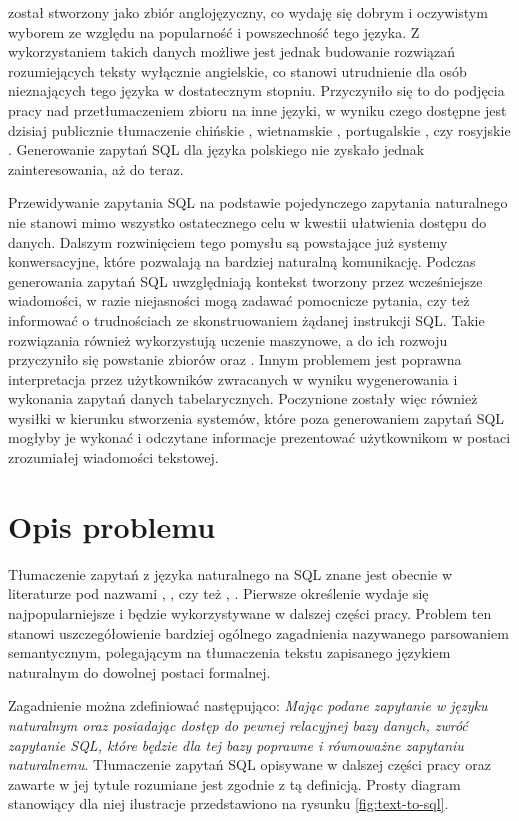  został stworzony jako zbiór anglojęzyczny, co wydaję się dobrym i oczywistym wyborem ze względu na popularność i powszechność tego języka. Z wykorzystaniem takich danych możliwe jest jednak budowanie rozwiązań rozumiejących teksty wyłącznie angielskie, co stanowi utrudnienie dla osób nieznających tego języka w dostatecznym stopniu. Przyczyniło się to do podjęcia pracy nad przetłumaczeniem zbioru  na inne języki, w wyniku czego dostępne jest dzisiaj publicznie tłumaczenie chińskie , wietnamskie , portugalskie , czy rosyjskie . Generowanie zapytań SQL dla języka polskiego nie zyskało jednak zainteresowania, aż do teraz.

Przewidywanie zapytania SQL na podstawie pojedynczego zapytania naturalnego nie stanowi mimo wszystko ostatecznego celu w kwestii ułatwienia dostępu do danych. Dalszym rozwinięciem tego pomysłu są powstające już systemy konwersacyjne, które pozwalają na bardziej naturalną komunikację. Podczas generowania zapytań SQL uwzględniają kontekst tworzony przez wcześniejsze wiadomości, w razie niejasności mogą zadawać pomocnicze pytania, czy też informować o trudnościach ze skonstruowaniem żądanej instrukcji SQL. Takie rozwiązania również wykorzystują uczenie maszynowe, a do ich rozwoju przyczyniło się powstanie zbiorów   oraz  . Innym problemem jest poprawna interpretacja przez użytkowników zwracanych w wyniku wygenerowania i wykonania zapytań danych tabelarycznych. Poczynione zostały więc również wysiłki w kierunku stworzenia systemów, które poza generowaniem zapytań SQL mogłyby je wykonać i odczytane informacje prezentować użytkownikom w postaci zrozumiałej wiadomości tekstowej.

\section{Opis problemu}
Tłumaczenie zapytań z języka naturalnego na SQL znane jest obecnie w literaturze pod nazwami , , czy też , . Pierwsze określenie wydaje się najpopularniejsze i będzie wykorzystywane w dalszej części pracy. Problem ten stanowi uszczegółowienie bardziej ogólnego zagadnienia nazywanego parsowaniem semantycznym, polegającym na tłumaczenia tekstu zapisanego językiem naturalnym do dowolnej postaci formalnej.

Zagadnienie  można zdefiniować następująco: \textit{Mając podane zapytanie w języku naturalnym oraz posiadając dostęp do pewnej relacyjnej bazy danych, zwróć zapytanie SQL, które będzie dla tej bazy poprawne i równoważne zapytaniu naturalnemu}. Tłumaczenie zapytań SQL opisywane w dalszej części pracy oraz zawarte w jej tytule rozumiane jest zgodnie z tą definicją. Prosty diagram stanowiący dla niej ilustracje przedstawiono na rysunku \ref{fig:text-to-sql}.


